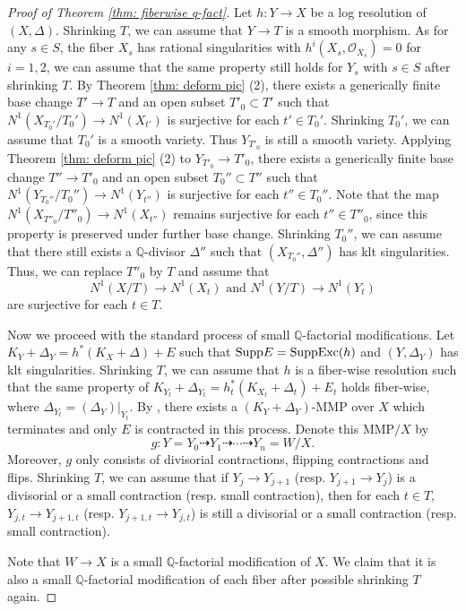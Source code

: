 \documentclass[11pt,oneside,reqno]{amsart}
\numberwithin{equation}{section}
\theoremstyle{definition}
\newcommand{\Exc}{{\rm {Exc}}}
\newcommand{\Supp}{{\rm {Supp}}}
\newcommand{\dto}{\dashrightarrow}
\newcommand{\bQ}{\mathbb{Q}}
\newcommand{\mO}{\mathcal{O}}
\begin{document}
\begin{proof}[Proof of Theorem \ref{thm: fiberwise q-fact}]
    Let $h: Y \to X$ be a log resolution of $(X, \Delta)$. Shrinking $T$, we can assume that $Y \to T$ is a smooth morphism. As for any $s\in S$, the fiber $X_s$ has rational singularities with $h^{i}(X_s, \mO_{X_s})=0$ for $i=1,2$, we can assume that the same property still holds for $Y_s$ with $s\in S$ after shrinking $T$. By Theorem \ref{thm: deform pic} (2), there exists a generically finite base change $T' \to T$  and an open subset $T'_0\subset T'$ such that $N^1(X_{T_0'}/T_0') \to N^1(X_{t'})$ is surjective for each $t' \in T_0'$. Shrinking $T_0'$, we can assume that $T_0'$ is a smooth variety. Thus $Y_{T'_0}$ is still a smooth variety. Applying Theorem \ref{thm: deform pic} (2) to $Y_{T'_0} \to T'_0$, there exists a generically finite base change $T'' \to {T'_0}$ and an open subset $T_0'' \subset T''$ such that $N^1(Y_{T_0''} / T_0'') \to N^1(Y_{t''})$ is surjective for each $t'' \in T_0''$. Note that the map $N^1(X_{T''_0}/T''_0) \to N^1(X_{t''})$ remains surjective for each $t''\in T''_0$, since this property is preserved under further base change. Shrinking $T_0''$, we can assume that there still exists a $\bQ$-divisor $\Delta''$ such that $(X_{T_0''}, \Delta'')$ has klt singularities. Thus, we can replace $T''_0$ by $T$ and assume that
    \[
    N^1(X/T) \to N^1(X_{t}) \text{~and~} N^1(Y/T) \to N^1(Y_{t})
    \] are surjective for each $t\in T$.

Now we proceed with the standard process of small $\bQ$-factorial modifications. Let $K_Y+ \Delta_Y = h^*(K_X+\Delta)+E$ such that $\Supp E = \Supp \Exc(h)$ and $(Y, \Delta_Y)$ has klt singularities. Shrinking $T$, we can assume that $h$ is a fiber-wise resolution such that the same property of $K_{Y_t}+ \Delta_{Y_t} = h_t^*(K_{X_t}+\Delta_t)+E_t$ holds fiber-wise, where $\Delta_{Y_t}=(\Delta_Y )|_{Y_t}$. By \cite{BCHM10}, there exists a $(K_Y+\Delta_Y)$-MMP over $X$ which terminates and only $E$ is contracted in this process. Denote this MMP$/X$ by 
\[
g: Y=Y_0 \dto Y_1 \dto \cdots \dto Y_n=W /X.
\] Moreover, $g$ only consists of divisorial contractions, flipping contractions and flips. Shrinking $T$, we can assume that if $Y_j \to Y_{j+1}$ (resp. $Y_{j+1} \to Y_{j}$) is a divisorial or a small contraction (resp. small contraction), then for each $t\in T$, $Y_{j,t} \to Y_{j+1,t}$ (resp. $Y_{j+1,t} \to Y_{j,t}$) is still a divisorial or a small contraction (resp. small contraction).

Note that $W \to X$ is a small $\bQ$-factorial modification of $X$. We claim that it is also a small $\bQ$-factorial modification of each fiber after possible shrinking $T$ again.


\end{proof}
\end{document}
